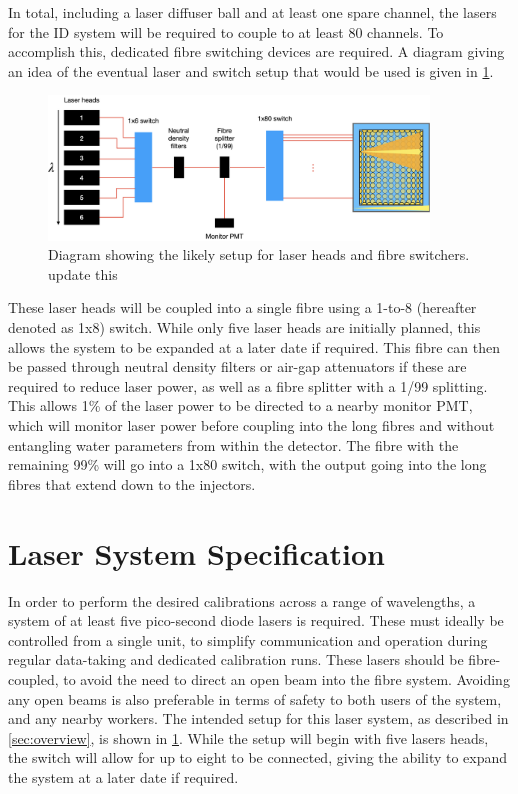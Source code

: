 \documentclass[a4paper,11pt]{article}
\begin{document}
In total, including a laser diffuser ball and at least one spare channel, the lasers for the ID system will be required to couple to at least 80 channels. To accomplish this, dedicated fibre switching devices are required. A diagram giving an idea of the eventual laser and switch setup that would be used is given in \cref{fig:laserswitches}.
\begin{figure}[h]
\centering
\includegraphics[width=0.9\textwidth]{switchConfiguration}
\caption{Diagram showing the likely setup for laser heads and fibre switchers.{\color{red} update this}}\label{fig:laserswitches}
\end{figure}
These laser heads will be coupled into a single fibre using a 1-to-8 (hereafter denoted as 1x8) switch. While only five laser heads are initially planned, this allows the system to be expanded at a later date if required. This fibre can then be passed through neutral density filters or air-gap attenuators if these are required to reduce laser power, as well as a fibre splitter with a 1/99 splitting. This allows 1\% of the laser power to be directed to a nearby monitor PMT, which will monitor laser power before coupling into the long fibres and without entangling water parameters from within the detector. The fibre with the remaining 99\% will go into a 1x80 switch, with the output going into the long fibres that extend down to the injectors.


\section{Laser System Specification}\label{sec:laser}
In order to perform the desired calibrations across a range of wavelengths, a system of at least five pico-second diode lasers is required. These must ideally be controlled from a single unit, to simplify communication and operation during regular data-taking and dedicated calibration runs. These lasers should be fibre-coupled, to avoid the need to direct an open beam into the fibre system. Avoiding any open beams is also preferable in terms of safety to both users of the system, and any nearby workers. The intended setup for this laser system, as described in \cref{sec:overview}, is shown in \cref{fig:laserswitches}. While the setup will begin with five lasers heads, the switch will allow for up to eight to be connected, giving the ability to expand the system at a later date if required.
\end{document}
